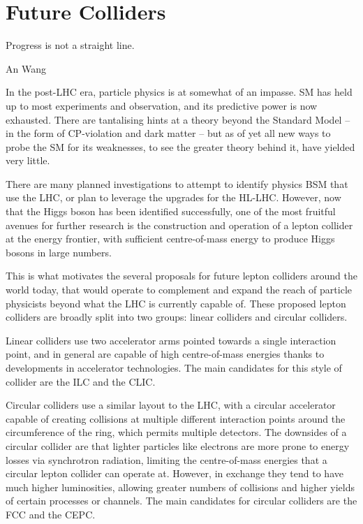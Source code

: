 \chapter{Future Colliders}
\label{chapter:colliders}

\epigraph{Progress is not a straight line.}{An Wang}

In the post-LHC era, particle physics is at somewhat of an impasse. \acrfull{SM} has held up to most experiments and observation, and its predictive power is now exhausted. There are tantalising hints at a theory beyond the Standard Model -- in the form of CP-violation and dark matter -- but as of yet all new ways to probe the \acrshort{SM} for its weaknesses, to see the greater theory behind it, have yielded very little. 

There are many planned investigations to attempt to identify physics \acrlong{BSM} that use the \acrfull{LHC}, or plan to leverage the upgrades for the \acrfull{HL-LHC}. However, now that the Higgs boson has been identified successfully, one of the most fruitful avenues for further research is the construction and operation of a lepton collider at the energy frontier, with sufficient centre-of-mass energy to produce Higgs bosons in large numbers.

This is what motivates the several proposals for future lepton colliders around the world today, that would operate to complement and expand the reach of particle physicists beyond what the \acrshort{LHC} is currently capable of. These proposed lepton colliders are broadly split into two groups: linear colliders and circular colliders. 

Linear colliders use two accelerator arms pointed towards a single interaction point, and in general are capable of high centre-of-mass energies thanks to developments in accelerator technologies. The main candidates for this style of collider are the \acrfull{ILC} and the \acrfull{CLIC}. 

Circular colliders use a similar layout to the \acrshort{LHC}, with a circular accelerator capable of creating collisions at multiple different interaction points around the circumference of the ring, which permits multiple detectors. The downsides of a circular collider are that lighter particles like electrons are more prone to energy losses via synchrotron radiation, limiting the centre-of-mass energies that a circular lepton collider can operate at. However, in exchange they tend to have much higher luminosities, allowing greater numbers of collisions and higher yields of certain processes or channels. The main candidates for circular colliders are the \acrfull{FCC} and the \acrfull{CEPC}. 

